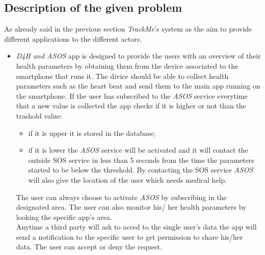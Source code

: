 \subsection{Description of the given problem}

As already said in the previous section \textit{TrackMe}'s system as the aim to provide different applications to the different actors.
\begin{itemize}
	\item {\textit{D4H and ASOS} app is designed to provide the users with an overview of their health parameters by obtaining 				them from the device associated to the smartphone that runs it. The divice should be able to collect health parameters 				such as the heart beat and send them to the main app running on the smartphone. If the user has subscribed to the 				\textit{ASOS} service everytime that a new value is collected the app checks if it is higher or not than the trashold value:
		\begin{itemize}
			\item {if it is upper it is stored in the database;}
			\item {if it is lower the \textit{ASOS} service will be activated and it will contact the outside SOS service in less 						than 5 seconds from the time the parameters started to be below the threshold. By contacting the SOS 						service \textit{ASOS} will also give the location of the user which needs medical help.}
		\end{itemize}
		The user can always choose to activate \textit{ASOS} by subscribing in the designated area. The user can also monitor his/			her health parameters by looking the specific app's area.\\
		Anytime a third party will ask to acced to the single user's data the app will send a notification to the specific user to get 			permission to share his/her data. The user can accept or deny the request.}


\end{itemize}
